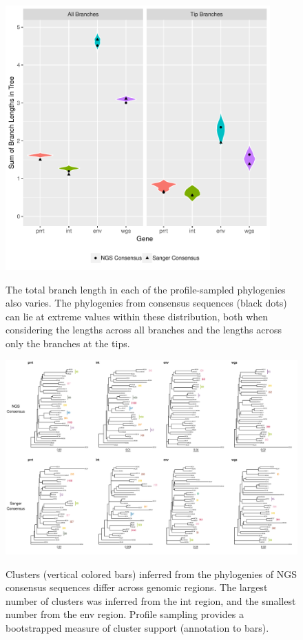 \documentclass[letterpaper]{article}
\begin{document}
\begin{figure}[p!]
	\caption{The total branch length in each of the profile-sampled phylogenies also varies. The phylogenies from consensus sequences (black dots) can lie at extreme values within these distribution, both when considering the lengths across all branches and the lengths across only the branches at the tips.}
	\centering
	\includegraphics[width=4in]{Figure3}
	\label{fig3}
\end{figure}

\begin{figure}[p!]
	\caption{Clusters (vertical colored bars) inferred from the phylogenies of NGS consensus sequences differ across genomic regions. The largest number of clusters was inferred from the int region, and the smallest number from the env region. Profile sampling provides a bootstrapped measure of cluster support (annotation to bars).}
	\centering
	\includegraphics[width=\linewidth]{Figure4}
	\label{fig4}
\end{figure}
\end{document}
